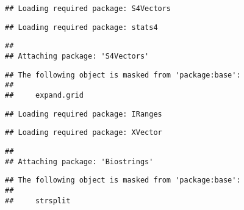 \documentclass[]{article}
\begin{document}
\begin{verbatim}
## Loading required package: S4Vectors
\end{verbatim}

\begin{verbatim}
## Loading required package: stats4
\end{verbatim}

\begin{verbatim}
## 
## Attaching package: 'S4Vectors'
\end{verbatim}

\begin{verbatim}
## The following object is masked from 'package:base':
## 
##     expand.grid
\end{verbatim}

\begin{verbatim}
## Loading required package: IRanges
\end{verbatim}

\begin{verbatim}
## Loading required package: XVector
\end{verbatim}

\begin{verbatim}
## 
## Attaching package: 'Biostrings'
\end{verbatim}

\begin{verbatim}
## The following object is masked from 'package:base':
## 
##     strsplit
\end{verbatim}
\end{document}
